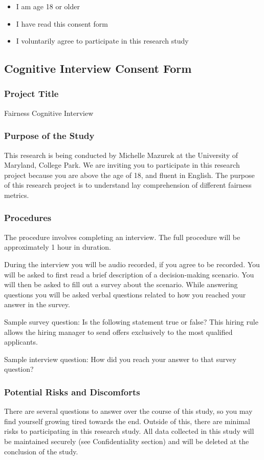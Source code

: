 \documentclass{article}
\newcommand{\checkbox}{\text{\fboxsep=-.15pt\fbox{\rule{0pt}{1.5ex}\rule{1.5ex}{0pt}}}}
\begin{document}
\begin{itemize}
    \item[\checkbox] I am age 18 or older
    \item[\checkbox] I have read this consent form
    \item[\checkbox] I voluntarily agree to participate in this research study
\end{itemize}

\subsection{Cognitive Interview Consent Form} \label{app:cognitive_consent}

\subsubsection{Project Title}
Fairness Cognitive Interview

\subsubsection{Purpose of the Study}
This research is being conducted by Michelle Mazurek at the University of Maryland, College Park. We are inviting you to participate in this research project because you are above the age of 18, and fluent in English. The purpose of this research project is to understand lay comprehension of different fairness metrics.  

\subsubsection{Procedures}
The procedure involves completing an interview. The full procedure will be approximately 1 hour in duration.

During the interview you will be audio recorded, if you agree to be recorded. You will be asked to first read a brief description of a decision-making scenario. You will then be asked to fill out a survey about the scenario. While answering questions you will be asked verbal questions related to how you reached your answer in the survey.

Sample survey question:
Is the following statement true or false? This hiring rule allows the hiring manager to send offers exclusively to the most qualified applicants.

Sample interview question:
How did you reach your answer to that survey question?

\subsubsection{Potential Risks and Discomforts}
There are several questions to answer over the course of this study, so you may find yourself growing tired towards the end. Outside of this, there are minimal risks to participating in this research study. All data collected in this study will be maintained securely (see Confidentiality section) and will be deleted at the conclusion of the study.
\end{document}
